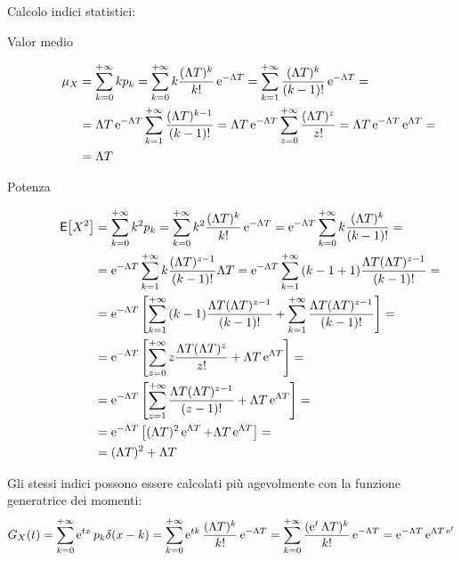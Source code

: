 Calcolo indici statistici:
\begin{description}
\item[Valor medio]
\begin{equation}
\begin{split}
	\mu_X&=\sum_{k=0}^{+\infty}{k p_k}=\sum_{k=0}^{+\infty}{k \frac{(\Lambda T)^k}{k!}\operatorname{e}^{-\Lambda T}}=\sum_{k=1}^{+\infty}{\frac{(\Lambda T)^k}{(k-1)!}\operatorname{e}^{-\Lambda T}}=\\
	&=\Lambda T \operatorname{e}^{-\Lambda T} \sum_{k=1}^{+\infty}{\frac{(\Lambda T)^{k-1}}{(k-1)!}}=\Lambda T \operatorname{e}^{-\Lambda T}\sum_{z=0}^{+\infty}{\frac{(\Lambda T)^z}{z!}}=\Lambda T \operatorname{e}^{-\Lambda T}\operatorname{e}^{\Lambda T}=\\
	&=\Lambda T
\end{split}
\end{equation}
\item[Potenza]
\begin{equation}
\begin{split}
	\,{\operatorname{\mathsf{E}}}\!\left[{X^2}\right]&=\sum_{k=0}^{+\infty}{k^2 p_k}=\sum_{k=0}^{+\infty}{k^2 \frac{(\Lambda T)^k}{k!}\operatorname{e}^{-\Lambda T}}=\operatorname{e}^{-\Lambda T}\sum_{k=0}^{+\infty}{k\frac{(\Lambda T)^k}{(k-1)!}}=\\
	&=\operatorname{e}^{-\Lambda T}\sum_{k=1}^{+\infty}{k\frac{(\Lambda T)^{z-1}}{(k-1)!}\Lambda T}=
	\operatorname{e}^{-\Lambda T}\sum_{k=1}^{+\infty}{(k-1+1)\frac{\Lambda T(\Lambda T)^{z-1}}{(k-1)!}}=\\
	&=\operatorname{e}^{-\Lambda T}\left[\sum_{k=1}^{+\infty}{(k-1)\frac{\Lambda T(\Lambda T)^{z-1}}{(k-1)!}} + \sum_{k=1}^{+\infty}{\frac{\Lambda T(\Lambda T)^{z-1}}{(k-1)!}}\right]=\\
	&=\operatorname{e}^{-\Lambda T}\left[\sum_{z=0}^{+\infty}{z\frac{\Lambda T(\Lambda T)^z}{z!}} + \Lambda T\operatorname{e}^{\Lambda T}\right]=\\
	&=\operatorname{e}^{-\Lambda T}\left[\sum_{z=1}^{+\infty}{\frac{\Lambda T(\Lambda T)^{z-1}}{(z-1)!}} + \Lambda T\operatorname{e}^{\Lambda T}\right]=\\
	&=\operatorname{e}^{-\Lambda T}\left[(\Lambda T)^2 \operatorname{e}^{\Lambda T} + \Lambda T\operatorname{e}^{\Lambda T}\right]=\\
	&=(\Lambda T)^2 + \Lambda T
\end{split}
\end{equation}
\end{description}

Gli stessi indici possono essere calcolati più agevolmente con la funzione generatrice dei momenti:
\begin{equation}
	G_X(t)=\sum_{k=0}^{+\infty}{\operatorname{e}^{t x}p_k\delta(x-k)}=\sum_{k=0}^{+\infty}{\operatorname{e}^{t k}\frac{(\Lambda T)^k}{k!}\operatorname{e}^{-\Lambda T}}=\sum_{k=0}^{+\infty}{\frac{(\operatorname{e}^{t}\Lambda T)^k}{k!}\operatorname{e}^{-\Lambda T}}=\operatorname{e}^{-\Lambda T}\operatorname{e}^{\Lambda T\operatorname{e}^{t}}
\end{equation}


